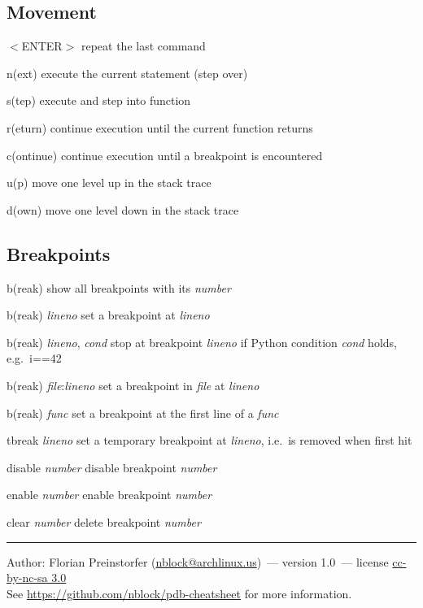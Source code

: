 \documentclass[10pt,landscape,a4paper]{article}
\makeatletter
\newcommand{\theauthor}{Florian Preinstorfer (\href{mailto:nblock@archlinux.us}{nblock@archlinux.us})}
\newcommand{\theversion}{1.0}
\newcommand{\keystroke}[1]{$<$#1$>$}
\makeatother
\begin{document}
\begin{multicols}{2}
    \subsection{Movement}
      \begin{eqlist}
        \item[\keystroke{ENTER}] repeat the last command
        \item[n(ext)] execute the current statement (step over)
        \item[s(tep)] execute and step into function
        \item[r(eturn)] continue execution until the current function returns
        \item[c(ontinue)] continue execution until a breakpoint is encountered
        \item[u(p)] move one level up in the stack trace
        \item[d(own)] move one level down in the stack trace
      \end{eqlist}

    \subsection{Breakpoints}
      \begin{eqlist}
        \item[b(reak)] show all breakpoints with its \textit{number}
        \item[b(reak) \textit{lineno}] set a breakpoint at \textit{lineno}
        \item[b(reak) \textit{lineno}, \textit{cond}] stop at breakpoint \textit{lineno} if Python condition \textit{cond} holds, e.g.\ i==42
        \item[b(reak) \textit{file}:\textit{lineno}] set a breakpoint in \textit{file} at \textit{lineno}
        \item[b(reak) \textit{func}] set a breakpoint at the first line of a \textit{func}
        \item[tbreak \textit{lineno}] set a temporary breakpoint at \textit{lineno}, i.e.\ is removed when first hit
        \item[disable \textit{number}] disable breakpoint \textit{number}
        \item[enable \textit{number}] enable breakpoint \textit{number}
        \item[clear \textit{number}] delete breakpoint \textit{number}
      \end{eqlist}

    \small{
    \hrule
    Author: \theauthor~--- version \theversion~--- license \href{https://creativecommons.org/licenses/by-nc-sa/3.0}{cc-by-nc-sa 3.0}\\
    See \url{https://github.com/nblock/pdb-cheatsheet} for more information.
    }
  \end{multicols}
\end{document}

